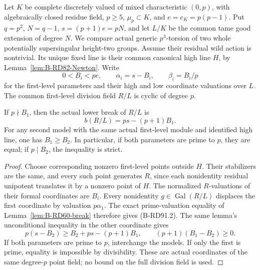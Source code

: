 Let \(K\) be complete discretely valued of mixed characteristic
\((0,p)\), with algebraically closed residue field, \(p\ge5\),
\(\mu_p\subset K\), and \(e=e_K=p(p-1)\). Put
\(q=p^2\), \(N=q-1\), \(s=(p+1)e=pN\), and let
\(L/K\) be the common tame good extension of degree \(N\).
We compare actual generic \(p^3\)-torsion of two whole potentially
supersingular height-two groups. Assume their residual wild action
is nontrivial. Its unique fixed line is their common canonical
high line \(H\), by Lemma~\ref{lem:B-RD82-Newton}. Write
\[
 0<B_i<pe,\qquad \alpha_i=s-B_i,\qquad \beta_i=B_i/p
                                                        \tag{B-RD91.1}
\]
for the first-level parameters and their high and low coordinate
valuations over \(L\). The common first-level division field
\(R/L\) is cyclic of degree \(p\).

\begin{lemma}
\label{lem:B-RD91-first-break}
If \(p\nmid B_1\), then the actual lower break of \(R/L\) is
\[
              b(R/L)=ps-(p+1)B_1.                    \tag{B-RD91.2}
\]
For any second model with the same actual first-level module and
identified high line, one has \(B_1\ge B_2\). In particular,
if both parameters are prime to \(p\), they are equal; if
\(p\mid B_2\), the inequality is strict.
\end{lemma}
\begin{proof}
Choose corresponding nonzero first-level points outside \(H\).
Their stabilizers are the same, and every such point generates
\(R\), since each nonidentity residual unipotent translates it
by a nonzero point of \(H\). The normalized \(R\)-valuations
of their formal coordinates are \(B_i\). Every nonidentity
\(g\in\operatorname{Gal}(R/L)\) displaces the first coordinate
by valuation \(p\alpha_1\). The exact prime-valuation equality
of Lemma~\ref{lem:B-RD60-break} therefore gives (B-RD91.2).
The same lemma's unconditional inequality in the other coordinate
gives
\[
 p(s-B_2)\ge B_2+ps-(p+1)B_1,
 \qquad (p+1)(B_1-B_2)\ge0.                          \tag{B-RD91.3}
\]
If both parameters are prime to \(p\), interchange the models.
If only the first is prime, equality is impossible by divisibility.
These are actual coordinates of the same degree-\(p\) point field;
no bound on the full division field is used.
\end{proof}

